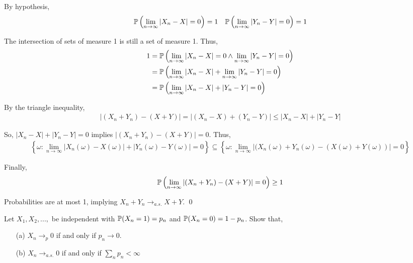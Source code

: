 \documentclass[10pt]{article}
\begin{document}
\begin{solution}

By hypothesis,
\begin{align*}
    \mathbb{P}\left(\lim_{n\to\infty}|X_n-X|=0\right)=1 &&
    \mathbb{P}\left(\lim_{n\to\infty}|Y_n-Y|=0\right)=1 
\end{align*}

The intersection of sets of measure 1 is still a set of measure 1. Thus,
\begin{align*}
    1 &= \mathbb{P} \left( \lim_{n\to\infty} |X_n-X| = 0 \wedge \lim_{n\to \infty} |Y_n-Y| = 0 \right) \\ 
      &= \mathbb{P} \left( \lim_{n\to\infty} |X_n-X| + \lim_{n\to \infty} |Y_n-Y| = 0 \right) \\ 
      &= \mathbb{P} \left( \lim_{n\to\infty} |X_n-X| + |Y_n-Y| = 0 \right) 
\end{align*}

By the triangle inequality,
\begin{align*}
    |(X_n+Y_n) - (X+Y)| = |(X_n-X)+(Y_n-Y)| \leq |X_n-X| + |Y_n-Y|
\end{align*}

So, \( |X_n-X|+|Y_n-Y| = 0 \) implies \( |(X_n+Y_n) - (X+Y)| = 0 \). Thus,
\begin{align*}
    \left\{ \omega :  \lim_{n\to\infty} |X_n(\omega)-X(\omega)| + |Y_n(\omega)-Y(\omega)| = 0  \right\}
    \subseteq \left\{ \omega :  \lim_{n\to\infty} |(X_n(\omega)+Y_n(\omega)-(X(\omega)+Y(\omega))| = 0  \right\}
\end{align*}

Finally,
\begin{align*}
    \mathbb{P} \left( \lim_{n\to\infty} |(X_n+Y_n) - (X+Y)| = 0 \right) \geq 1
\end{align*}

Probabilities are at most 1, implying \( X_n+Y_n \to_{a.s.}X+Y \). \qed


\end{solution}

\begin{problem}[Exercise 6.6]
    Let \( X_1,X_2, ...,  \) be independent with \( \mathbb{P}(X_n=1) = p_n \) and \( \mathbb{P}(X_n=0) = 1-p_n \). Show that,
    \begin{enumerate}
        \item[(a)] \( X_n \to_{p} 0 \) if and only if \( p_n\to 0 \).
        \item[(b)] \( X_n \to_{a.s.} 0 \) if and only if \( \sum_{n}p_n < \infty \)
    \end{enumerate}
\end{problem}
\end{document}

